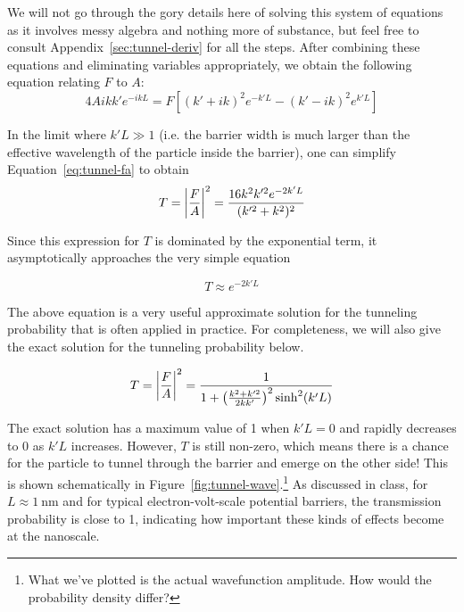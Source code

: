We will not go through the gory details here of solving this system of equations as it involves messy algebra and nothing more of substance, but feel free to consult Appendix~\ref{sec:tunnel-deriv} for all the steps. After combining these equations and eliminating variables appropriately, we obtain the following equation relating $F$ to $A$:
\begin{equation}
	4Aikk'e^{-ikL} = F \left[(k'+ik)^2e^{-k'L} - (k'-ik)^2e^{k'L}\right] \label{eq:tunnel-fa}
\end{equation}

In the limit where $k'L \gg 1$ (i.e. the barrier width is much larger than the effective wavelength of the particle inside the barrier), one can simplify Equation~\ref{eq:tunnel-fa} to obtain
\begin{equation}
	T = \abs{\frac{F}{A}}^2 = \frac{16k^2k^{\prime 2}e^{-2k'L}}{(k^{\prime 2}+k^2)^2} \label{eq:tunnel-prob}
\end{equation}

Since this expression for $T$ is dominated by the exponential term, it asymptotically approaches the very simple equation
\begin{tcolorbox}[title = Tunneling probability approximation when $E < V_0$] \vspace{-2ex}
	\begin{equation}
		T \approx e^{-2k'L} \label{eq:tunnel-approx}
	\end{equation}
\end{tcolorbox}

The above equation is a very useful approximate solution for the tunneling probability that is often applied in practice. For completeness, we will also give the exact solution for the tunneling probability below.
\begin{tcolorbox}[title = Tunneling probability exact solution when $E < V_0$] \vspace{-2ex}
	\begin{equation}
		T = \abs{\frac{F}{A}}^2 = \frac{1}{1 + \left(\frac{k^2+k^{\prime 2}}{2kk'}\right)^2 \sinh^2(k'L)} \label{eq:tunnel-prob-full}
	\end{equation}
\end{tcolorbox}

The exact solution has a maximum value of 1 when $k'L=0$ and rapidly decreases to 0 as $k'L$ increases. However, $T$ is still non-zero, which means there is a chance for the particle to tunnel through the barrier and emerge on the other side! This is shown schematically in Figure~\ref{fig:tunnel-wave}.\footnote{What we've plotted is the actual wavefunction amplitude. How would the probability density differ?} As discussed in class, for $L \approx \SI{1}{\nano\meter}$ and for typical electron-volt-scale potential barriers, the transmission probability is close to 1, indicating how important these kinds of effects become at the nanoscale. \par

